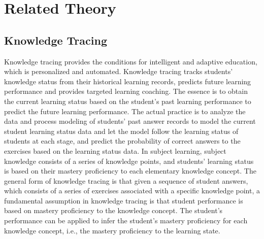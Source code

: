 \section{Related Theory}
\subsection{Knowledge Tracing}


Knowledge tracing provides the conditions for intelligent and adaptive education, which is personalized and automated. Knowledge tracing tracks students' knowledge status from their historical learning records, predicts future learning performance and provides targeted learning coaching. The essence is to obtain the current learning status based on the student's past learning performance to predict the future learning performance. The actual practice is to analyze the data and process modeling of students' past answer records to model the current student learning status data and let the model follow the learning status of students at each stage, and predict the probability of correct answers to the exercises based on the learning status data. In subject learning, subject knowledge consists of a series of knowledge points, and students' learning status is based on their mastery proficiency to each elementary knowledge concept. The general form of knowledge tracing is that given a sequence of student answers, which consists of a series of exercises associated with a specific knowledge point, a fundamental assumption in knowledge tracing is that student performance is based on mastery proficiency to the knowledge concept. The student's performance can be applied to infer the student's mastery proficiency for each knowledge concept, i.e., the mastery proficiency to the learning state.

